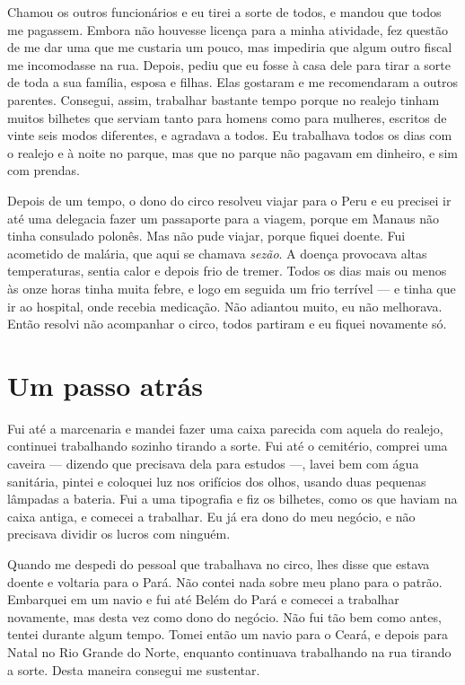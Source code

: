 Chamou os outros funcionários e eu tirei a sorte de todos, e mandou
que todos me pagassem. Embora não houvesse licença para a minha
atividade, fez questão de me dar uma que me custaria um pouco, mas
impediria que algum outro fiscal me incomodasse na rua. Depois, pediu que
eu fosse à casa dele para tirar a sorte de toda a sua família, esposa e
filhas. Elas gostaram e me recomendaram a outros parentes. Consegui, assim,
trabalhar bastante tempo porque no realejo tinham muitos bilhetes que
serviam tanto para homens como para mulheres, escritos de vinte seis
modos diferentes, e agradava a todos. Eu trabalhava
todos os dias com o realejo e à noite no parque, mas que no parque não
pagavam em dinheiro, e sim com prendas.

Depois de um tempo, o dono do circo resolveu viajar para o Peru e eu precisei 
ir até uma delegacia fazer um passaporte para a viagem, porque em
Manaus não tinha consulado polonês. Mas não pude viajar, porque fiquei
doente. Fui acometido de malária, que aqui se chamava \textit{sezão}. A doença
provocava altas temperaturas, sentia calor e depois frio de tremer.
Todos os dias mais ou menos às onze horas tinha muita febre, e logo em
seguida um frio terrível --- e tinha que ir ao hospital, onde recebia
medicação. Não adiantou muito, eu não melhorava. Então resolvi não
acompanhar o circo, todos partiram e eu fiquei novamente só.

\chapter{Um passo atrás}

Fui até a marcenaria e mandei fazer uma caixa parecida com aquela do
realejo, continuei trabalhando sozinho tirando a sorte. Fui até o
cemitério, comprei uma caveira --- dizendo que precisava dela para estudos  ---,
lavei bem com água sanitária, pintei e coloquei luz nos orifícios dos
olhos, usando duas pequenas lâmpadas a bateria. Fui a uma tipografia e
fiz os bilhetes, como os que haviam na caixa antiga, e comecei a trabalhar. Eu
já era dono do meu negócio, e não precisava dividir os lucros com
ninguém.

Quando me despedi do pessoal que trabalhava no circo, lhes disse que
estava doente e voltaria para o Pará. Não contei nada sobre meu plano
para o patrão. Embarquei em um navio e fui até Belém do Pará e comecei a
trabalhar novamente, mas desta vez como dono do negócio. Não fui tão bem 
como antes, tentei durante algum tempo. Tomei então um navio para o 
Ceará, e depois para Natal no Rio Grande do Norte, enquanto continuava
trabalhando na rua tirando a sorte. Desta maneira consegui me
sustentar.

